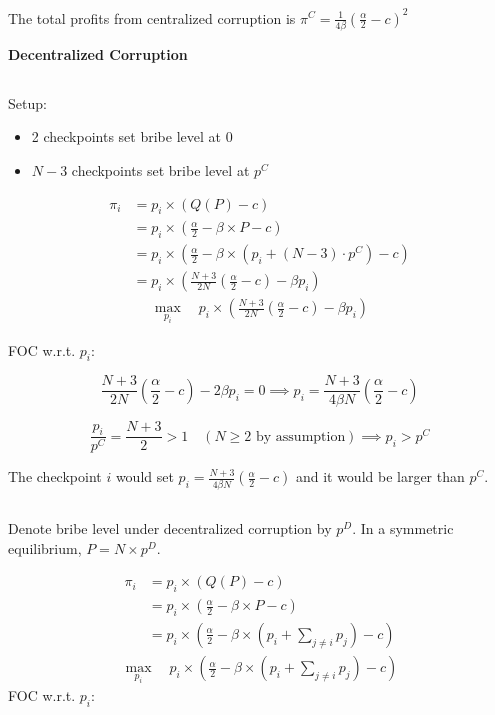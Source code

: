 \documentclass[a4paper]{article}
\begin{document}
The total profits from centralized corruption is $\pi^C=\frac{1}{4\beta}\left(\frac{\alpha}{2}-c\right)^2$ 

\textbf{Decentralized Corruption}

\subsection{}
Setup:
\begin{itemize}
    \item 2 checkpoints set bribe level at 0
    \item $N-3$ checkpoints set bribe level at $p^C$
\end{itemize}
\begin{align*}
    \pi_i&=p_i\times (Q(P)-c) \\
    &=p_i\times\left(\frac{\alpha}{2}-\beta\times P-c \right) \\
    &=p_i\times\left(\frac{\alpha}{2}-\beta\times\left(p_i + (N-3)\cdot p^C\right)-c \right) \\
    &=p_i\times\left(\frac{N+3}{2N}\left(\frac{\alpha}{2}-c\right)-\beta p_i \right) 
\end{align*}
\begin{align*}
    \max_{p_i}\quad p_i\times\left(\frac{N+3}{2N}\left(\frac{\alpha}{2}-c\right)-\beta p_i \right) 
\end{align*}

FOC w.r.t. $p_i$:

\begin{equation*}
    \frac{N+3}{2N}\left(\frac{\alpha}{2}-c\right)-2\beta p_i=0\implies 
    p_i=\frac{N+3}{4\beta N}\left(\frac{\alpha}{2}-c\right)
\end{equation*}

\begin{equation*}
    \frac{p_i}{p^C}=\frac{N+3}{2}>1\quad (N\geq 2\text{ by assumption})\implies p_i>p^C
\end{equation*}

The checkpoint $i$ would set $p_i=\frac{N+3}{4\beta N}\left(\frac{\alpha}{2}-c\right)$ and it would be larger than $p^C$.

\subsection{}

Denote bribe level under decentralized corruption by $p^D$. In a symmetric equilibrium, $P=N\times p^D$.

\begin{align*}
    \pi_i&=p_i\times (Q(P)-c) \\
    &=p_i\times\left(\frac{\alpha}{2}-\beta\times P-c \right) \\
    &=p_i\times\left(\frac{\alpha}{2}-\beta\times\left(p_i + \sum_{j\neq i}p_j\right)-c \right)
\end{align*}
\begin{align*}
    \max_{p_i}\quad p_i\times\left(\frac{\alpha}{2}-\beta\times\left(p_i + \sum_{j\neq i}p_j\right)-c \right)
\end{align*}
FOC w.r.t. $p_i$:
\end{document}
